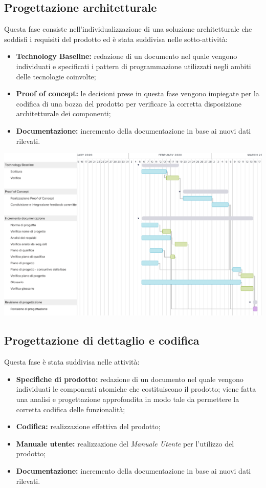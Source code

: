 \subsection{Progettazione architetturale}
Questa fase consiste nell'individualizzazione di una soluzione architetturale che soddisfi i requisiti del prodotto ed è stata suddivisa nelle sotto-attività:
\begin{itemize}
	\item \textbf{Technology Baseline:} redazione di un documento nel quale vengono individuati e specificati i pattern di programmazione utilizzati negli ambiti delle tecnologie coinvolte;
	\item  \textbf{Proof of concept:} le decisioni prese in questa fase vengono impiegate per la codifica di una bozza del prodotto per verificare la corretta disposizione architetturale dei componenti;
	\item \textbf{Documentazione:} incremento della documentazione in base ai nuovi dati rilevati.
\end{itemize}
\includegraphics[width=\textwidth]{res/img/g3}

\subsection{Progettazione di dettaglio e codifica}
Questa fase è stata suddivisa nelle attività:
\begin{itemize}
	\item \textbf{Specifiche di prodotto:} redazione di un documento nel quale vengono individuati le componenti atomiche che costituiscono il prodotto; viene fatta una analisi e progettazione approfondita in modo tale da permettere la corretta codifica delle funzionalità;
	\item  \textbf{Codifica:} realizzazione effettiva del prodotto;
	\item \textbf{Manuale utente:} realizzazione del \textit{Manuale Utente} per l'utilizzo del prodotto;
	\item \textbf{Documentazione:} incremento della documentazione in base ai nuovi dati rilevati.
\end{itemize}


